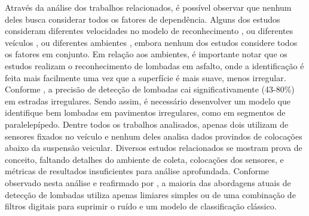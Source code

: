 Através da análise dos trabalhos relacionados, é possível observar que nenhum deles busca considerar todos os fatores de dependência. Alguns dos estudos consideram diferentes velocidades no modelo de reconhecimento  \cite{Rishiwal2016,Aljaafreh2017,Sabir2019}, ou diferentes veículos \cite{Savera2016,Idris2019,Alam2020}, ou diferentes ambientes \cite{Padilla2018}, embora nenhum dos estudos considere todos os fatores em conjunto. Em relação aos ambientes, é importante notar que os estudos realizam o reconhecimento de lombadas em asfalto, onde a identificação é feita mais facilmente uma vez que a superfície é mais suave, menos irregular. Conforme \cite{Alam2020}, a precisão de detecção de lombadas cai significativamente (43-80\%) em estradas irregulares. Sendo assim, é necessário desenvolver um modelo que identifique bem lombadas em pavimentos irregulares, como em segmentos de paralelepípedo. Dentre todos os trabalhos analisados, apenas dois utilizam de sensores fixados no veículo e nenhum deles analisa dados provindos de colocações abaixo da suspensão veicular. Diversos estudos relacionados se mostram prova de conceito, faltando detalhes do ambiente de coleta, colocações dos sensores, e métricas de resultados insuficientes para análise aprofundada. Conforme observado nesta análise e reafirmado por \cite{Padilla2018}, a maioria das abordagens atuais de detecção de lombadas utiliza apenas limiares simples ou de uma combinação de filtros digitais para suprimir o ruído e um modelo de classificação clássico.
